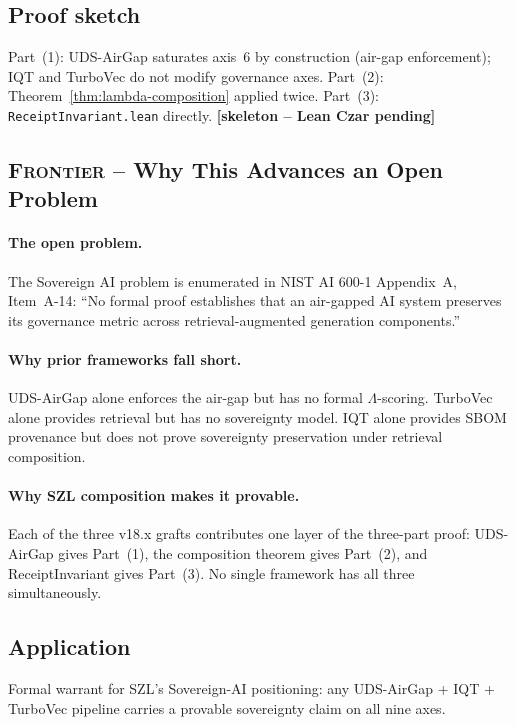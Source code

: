 \subsection*{Proof sketch}

Part~(1): UDS-AirGap saturates axis~6 by construction (air-gap
enforcement); IQT and TurboVec do not modify governance axes.
Part~(2): Theorem~\ref{thm:lambda-composition} applied twice.
Part~(3): \texttt{ReceiptInvariant.lean} directly.
\hfill \textbf{[skeleton -- Lean Czar pending]}

\subsection*{\textsc{Frontier} -- Why This Advances an Open Problem}

\paragraph{The open problem.}
The Sovereign AI problem is enumerated in
NIST AI 600-1 Appendix~A, Item~A-14: ``No formal proof establishes
that an air-gapped AI system preserves its governance metric across
retrieval-augmented generation components.''

\paragraph{Why prior frameworks fall short.}
UDS-AirGap alone enforces the air-gap but has no formal \(\Lambda\)-scoring.
TurboVec alone provides retrieval but has no sovereignty model.
IQT alone provides SBOM provenance but does not prove sovereignty
preservation under retrieval composition.

\paragraph{Why SZL composition makes it provable.}
Each of the three v18.x grafts contributes one layer of the
three-part proof: UDS-AirGap gives Part~(1), the composition theorem
gives Part~(2), and ReceiptInvariant gives Part~(3).  No single
framework has all three simultaneously.

\subsection*{Application}

Formal warrant for SZL's Sovereign-AI positioning:
any UDS-AirGap + IQT + TurboVec pipeline carries a provable
sovereignty claim on all nine axes.

